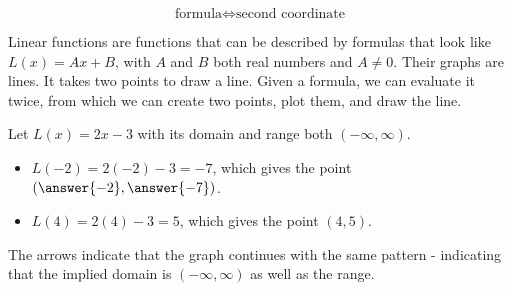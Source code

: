\documentclass{ximera}
\begin{document}
\[ \text{formula} \iff \text{second coordinate} \]









\begin{example}

Linear functions are functions that can be described by formulas that look like $L(x) = A x + B$, with $A$ and $B$ both real numbers and $A \ne 0$.  Their graphs are lines.  It takes two points to draw a line. Given a formula, we can evaluate it twice, from which we can create two points, plot them, and draw the line.

Let $L(x) = 2x-3$ with its domain and range both $(-\infty, \infty)$.

\begin{itemize}
\item $L(-2) = 2(-2) - 3 = -7$, which gives the point $\left(\answer{-2}, \answer{-7}\right)$.
\item $L(4) = 2(4) - 3 = 5$, which gives the point $(4, 5)$.
\end{itemize}






\begin{image}
\end{image}

The arrows indicate that the graph continues with the same pattern - indicating that the implied domain is $(-\infty, \infty)$ as well as the range.


\end{example}
\end{document}
